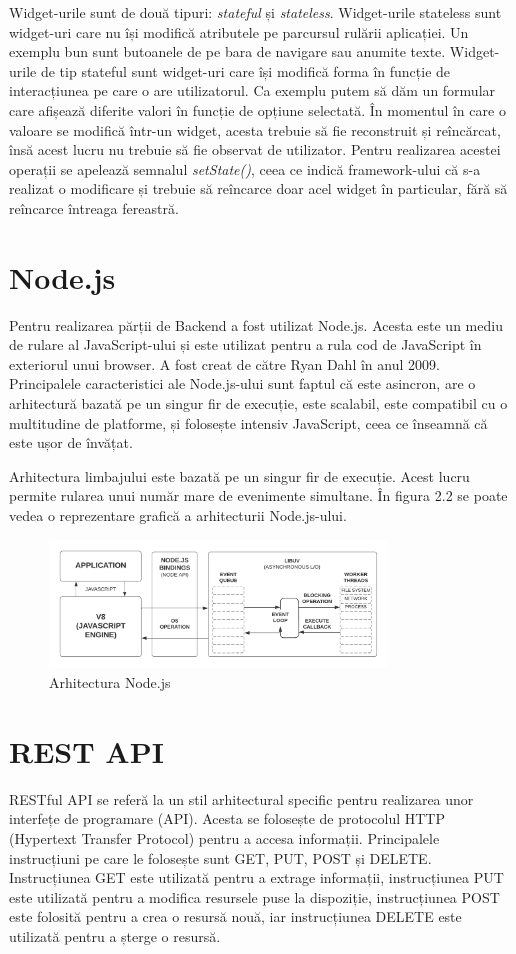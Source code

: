 \documentclass[12pt,a4paper]{report}
\theoremstyle{definition}
\theoremstyle{remark}
\begin{document}
Widget-urile sunt de două tipuri: \emph{stateful} și \emph{stateless}. Widget-urile stateless sunt widget-uri care nu își modifică atributele pe parcursul rulării aplicației. Un exemplu bun sunt butoanele de pe bara de navigare sau anumite texte. Widget-urile de tip stateful sunt widget-uri care își modifică forma în funcție de interacțiunea pe care o are utilizatorul. Ca exemplu putem să dăm un formular care afișează diferite valori în funcție de opțiune selectată. În momentul în care o valoare se modifică într-un widget, acesta trebuie să fie reconstruit și reîncărcat, însă acest lucru nu trebuie să fie observat de utilizator. Pentru realizarea acestei operații se apelează semnalul \emph{setState()}, ceea ce indică framework-ului că s-a realizat o modificare și trebuie să reîncarce doar acel widget în particular, fără să reîncarce întreaga fereastră. \cite{flutter:2023}
\newpage
\section{Node.js}
Pentru realizarea părții de Backend a fost utilizat Node.js. Acesta este un mediu de rulare al JavaScript-ului și este utilizat pentru a rula cod de JavaScript în exteriorul unui browser. A fost creat de către Ryan Dahl în anul 2009. Principalele caracteristici ale Node.js-ului sunt faptul că este asincron, are o arhitectură bazată pe un singur fir de execuție, este scalabil, este compatibil cu o multitudine de platforme, și folosește intensiv JavaScript, ceea ce înseamnă că este ușor de învățat. 

Arhitectura limbajului este bazată pe un singur fir de execuție. Acest lucru permite rularea unui număr mare de evenimente simultane. În figura 2.2 se poate vedea o reprezentare grafică a arhitecturii Node.js-ului. \cite{nodejs:2023}
\begin{figure}[H]
    	\centering
    	\includegraphics[width = 0.8\textwidth]{images/nodejs}
	\caption{Arhitectura Node.js}
\end{figure}
\section{REST API}
RESTful API se referă la un stil arhitectural specific pentru realizarea unor interfețe de programare (API). Acesta se folosește de protocolul HTTP (Hypertext Transfer Protocol) pentru a accesa informații. Principalele instrucțiuni pe care le folosește sunt GET, PUT, POST și DELETE. Instrucțiunea GET este utilizată pentru a extrage informații, instrucțiunea PUT este utilizată pentru a modifica resursele puse la dispoziție, instrucțiunea POST este folosită pentru a crea o resursă nouă, iar instrucțiunea DELETE este utilizată pentru a șterge o resursă. 
\end{document}
